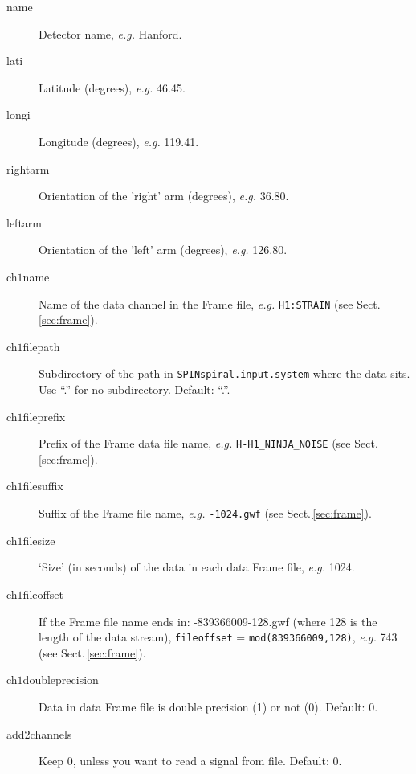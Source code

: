 \documentclass[10pt]{article}
\begin{document}
\begin{description}
\item[name] Detector name, \textit{e.g.} Hanford.
\item[lati] Latitude (degrees), \textit{e.g.} 46.45.
\item[longi] Longitude (degrees), \textit{e.g.} 119.41.
\item[rightarm] Orientation of the 'right' arm (degrees), \textit{e.g.} 36.80.
\item[leftarm] Orientation of the 'left' arm (degrees), \textit{e.g.} 126.80.
                                                                                                                                                                                                               
\item[ch$1$name] Name of the data channel in the Frame file, \textit{e.g.} \texttt{H1:STRAIN} (see Sect.\,\ref{sec:frame}).
\item[ch$1$filepath] Subdirectory of the path in \texttt{SPINspiral.input.system} where the data sits.  Use ``.'' for no subdirectory.  Default: ``.''.
\item[ch$1$fileprefix] Prefix of the Frame data file name, \textit{e.g.} \texttt{H-H1\_NINJA\_NOISE} (see Sect.\,\ref{sec:frame}).
\item[ch$1$filesuffix] Suffix of the Frame file name, \textit{e.g.} \texttt{-1024.gwf} (see Sect.\,\ref{sec:frame}).
\item[ch$1$filesize] `Size' (in seconds) of the data in each data Frame file, \textit{e.g.} 1024.
\item[ch$1$fileoffset] If the Frame file name ends in: -839366009-128.gwf (where 128 is the length of the data stream), \texttt{fileoffset} = \texttt{mod(839366009,128)}, \textit{e.g.} 743 (see Sect.\,\ref{sec:frame}).
\item[ch$1$doubleprecision] Data in data Frame file is double precision (1) or not (0).  Default: 0.
\item[add2channels] Keep 0, unless you want to read a signal from file.  Default: 0.


\end{description}
\end{document}
